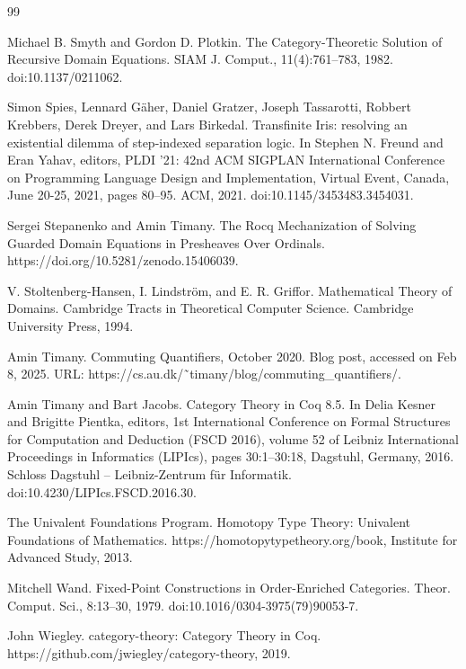 \documentclass[10pt,a4paper]{article}
\begin{document}
\begin{thebibliography}{99}
\par\noindent    Michael B. Smyth and Gordon D. Plotkin.  The Category-Theoretic Solution of Recursive Domain Equations.  SIAM J. Comput., 11(4):761–783, 1982.  doi:10.1137/0211062.  

\par\noindent    Simon Spies, Lennard Gäher, Daniel Gratzer, Joseph Tassarotti, Robbert Krebbers, Derek Dreyer, and Lars Birkedal.  Transfinite Iris: resolving an existential dilemma of step-indexed separation logic.  In Stephen N. Freund and Eran Yahav, editors, PLDI ’21: 42nd ACM SIGPLAN International Conference on Programming Language Design and Implementation, Virtual Event, Canada, June 20-25, 2021, pages 80–95. ACM, 2021.  doi:10.1145/3453483.3454031.  

\par\noindent    Sergei Stepanenko and Amin Timany.  The Rocq Mechanization of Solving Guarded Domain Equations in Presheaves Over Ordinals.  https://doi.org/10.5281/zenodo.15406039.  

\par\noindent    V. Stoltenberg-Hansen, I. Lindström, and E. R. Griffor.  Mathematical Theory of Domains.  Cambridge Tracts in Theoretical Computer Science. Cambridge University Press, 1994.  

\par\noindent    Amin Timany.  Commuting Quantifiers, October 2020.  Blog post, accessed on Feb 8, 2025.  URL: https://cs.au.dk/˜timany/blog/commuting\_quantifiers/.  

\par\noindent    Amin Timany and Bart Jacobs.  Category Theory in Coq 8.5.  In Delia Kesner and Brigitte Pientka, editors, 1st International Conference on Formal Structures for Computation and Deduction (FSCD 2016), volume 52 of Leibniz International Proceedings in Informatics (LIPIcs), pages 30:1–30:18, Dagstuhl, Germany, 2016. Schloss Dagstuhl – Leibniz-Zentrum für Informatik.  doi:10.4230/LIPIcs.FSCD.2016.30.  

\par\noindent    The Univalent Foundations Program.  Homotopy Type Theory: Univalent Foundations of Mathematics.  https://homotopytypetheory.org/book, Institute for Advanced Study, 2013.  

\par\noindent    Mitchell Wand.  Fixed-Point Constructions in Order-Enriched Categories.  Theor. Comput. Sci., 8:13–30, 1979.  doi:10.1016/0304-3975(79)90053-7.  

\par\noindent    John Wiegley.  category-theory: Category Theory in Coq.  https://github.com/jwiegley/category-theory, 2019.  

\end{thebibliography}
\end{document}
